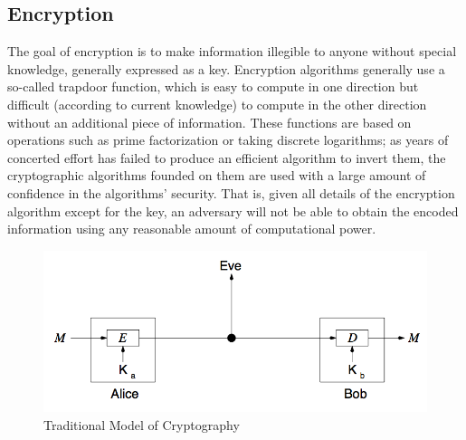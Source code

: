 \documentclass[times, 10pt,twocolumn]{article}
\begin{document}
\subsection{Encryption}
The goal of encryption is to make information illegible to anyone without special knowledge, generally expressed as a key.  Encryption algorithms generally use a so-called trapdoor function, which is easy to compute in one direction but difficult (according to current knowledge) to compute in the other direction without an additional piece of information.  These functions are based on operations such as prime factorization or taking discrete logarithms; as years of concerted effort has failed to produce an efficient algorithm to invert them, the cryptographic algorithms founded on them are used with a large amount of confidence in the algorithms' security.  That is, given all details of the encryption algorithm except for the key, an adversary will not be able to obtain the encoded information using any reasonable amount of computational power.
\begin{figure}[ht]
  \centering
  \includegraphics[scale=.25]{./images/traditional_model.png}
  \caption{Traditional Model of Cryptography}
  \label{fig:top_arch}
\end{figure}
\end{document}
